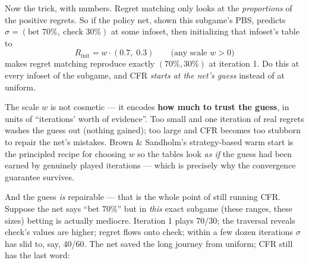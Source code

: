 \documentclass[11pt,a4paper]{article}
\begin{document}
Now the trick, with numbers. Regret matching only looks at the
\emph{proportions} of the positive regrets. So if the policy net, shown this
subgame's PBS, predicts $\hat\sigma = (\text{bet } 70\%,\ \text{check }
30\%)$ at some infoset, then initializing that infoset's table to
\[
R_{\mathrm{init}} = w \cdot (0.7,\; 0.3)
\qquad\text{(any scale } w > 0\text{)}
\]
makes regret matching reproduce exactly $(70\%, 30\%)$ at iteration 1. Do
this at every infoset of the subgame, and CFR \emph{starts at the net's
guess} instead of at uniform.

The scale $w$ is not cosmetic --- it encodes \textbf{how much to trust the
guess}, in units of ``iterations' worth of evidence''. Too small and one
iteration of real regrets washes the guess out (nothing gained); too large
and CFR becomes too stubborn to repair the net's mistakes. Brown \&
Sandholm's strategy-based warm start is the principled recipe for choosing
$w$ so the tables look \emph{as if} the guess had been earned by genuinely
played iterations --- which is precisely why the convergence guarantee
survives.

And the guess \emph{is} repairable --- that is the whole point of still
running CFR. Suppose the net says ``bet 70\%'' but in \emph{this} exact
subgame (these ranges, these sizes) betting is actually mediocre. Iteration
1 plays 70/30; the traversal reveals check's values are higher; regret flows
onto check; within a few dozen iterations $\sigma$ has slid to, say, 40/60.
The net saved the long journey from uniform; CFR still has the last word:

\begin{center}
\end{center}
\end{document}
